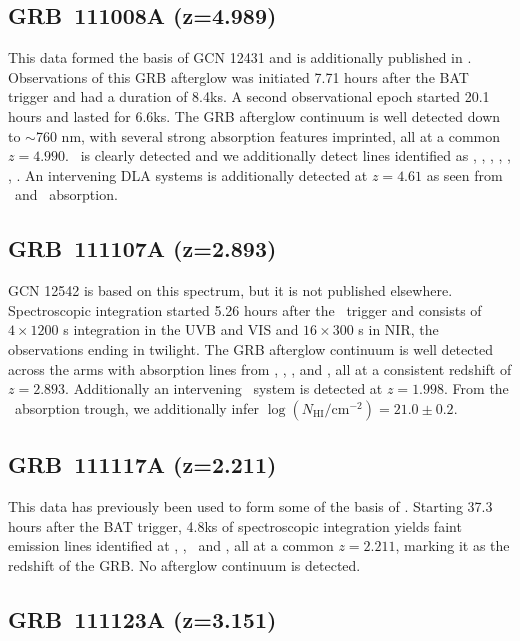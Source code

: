 \documentclass{aa}    %
\begin{document}
\subsection{GRB~111008A  (z=4.989)} \label{111008}

This data formed the basis of GCN 12431 \citep{GCN12431} and is additionally
published in \citet{Sparre2014}. Observations of this GRB afterglow was
initiated 7.71 hours after the BAT trigger and had a duration of 8.4ks. A second
observational epoch started 20.1 hours and lasted for 6.6ks. The GRB afterglow
continuum is well detected down to $\sim$760 nm, with several strong
absorption features imprinted, all at a common $z = 4.990$. \lya~is clearly
detected and we additionally detect lines identified as \SIii, \feii, \civ,
\mgii, \SIii*, \sii*, \oi*. An intervening DLA systems is additionally detected
at  $z = 4.61$ as seen from \lya~and \mgii~absorption.

\subsection{GRB~111107A (z=2.893)} \label{111107}

GCN  12542 \citep{GCN12542} is based on this spectrum, but it is not published
elsewhere. Spectroscopic integration started 5.26 hours after the \swift~trigger
and consists of $4 \times 1200$ s integration in the UVB and VIS and $16 \times
300$ s in NIR, the observations ending in twilight. The GRB afterglow continuum
is well detected across the arms with absorption lines from \lya, \civ, \feii,
and \mgii, all at a consistent redshift of $z = 2.893$. Additionally an
intervening \mgii~system is detected at $z = 1.998$. From the \lya~absorption
trough, we additionally infer $\log (N_{\mathrm{HI}}/\mathrm{cm}^{-2}) = 21.0
\pm 0.2$.

\subsection{GRB~111117A (z=2.211)} \label{111117}

This data has previously been used to form some of the basis of
\citet{Selsing2017}. Starting 37.3 hours after the BAT trigger, 4.8ks of
spectroscopic integration yields faint emission lines identified at \oii, \hb,
\oiii~and \ha, all at a common $z = 2.211$, marking it as the redshift of the
GRB. No afterglow continuum is detected.

\subsection{GRB~111123A  (z=3.151)} \label{111123}
\end{document}
